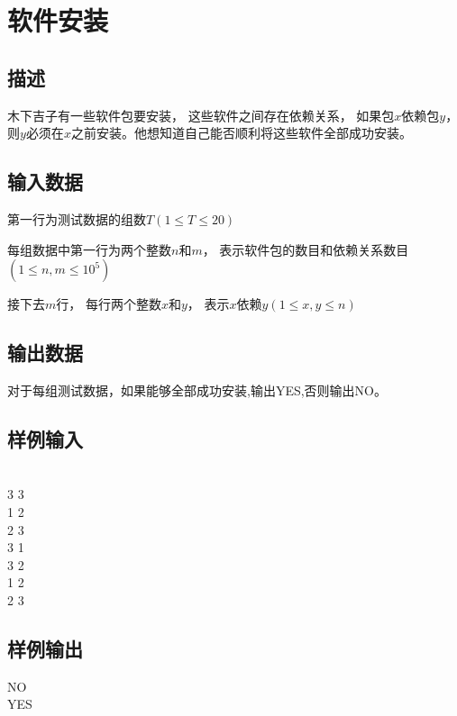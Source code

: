 \ifx\allfiles\undefined

\fi


\section{软件安装}
\subsection*{描述}
木下吉子有一些软件包要安装， 这些软件之间存在依赖关系， 如果包$x$依赖包$y$， 则$y$必须在$x$之前安装。他想知道自己能否顺利将这些软件全部成功安装。

\subsection*{输入数据}
第一行为测试数据的组数$T(1\leqslant T\leqslant 20)$

每组数据中第一行为两个整数$n$和$m$， 表示软件包的数目和依赖关系数目$(1\leqslant n, m\leqslant 10^5)$

接下去$m$行， 每行两个整数$x$和$y$， 表示$x$依赖$y(1\leqslant x, y\leqslant n)$

\subsection*{输出数据}
对于每组测试数据，如果能够全部成功安装,输出YES,否则输出NO。

\subsection*{样例输入}
\\
3 3\\
1 2\\
2 3\\
3 1\\
3 2\\
1 2\\
2 3

\subsection*{样例输出}
\noindent NO\\
YES


\ifx\allfiles\undefined

\fi